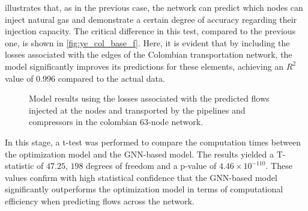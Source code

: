  illustrates that, as in the previous case, the network can predict which nodes can inject natural gas and demonstrate a certain degree of accuracy regarding their injection capacity. The critical difference in this test, compared to the previous one, is shown in \cref{fig:ye_col_base_f}. Here, it is evident that by including the losses associated with the edges of the Colombian transportation network, the model significantly improves its predictions for these elements, achieving an $R^2$ value of 0.996 compared to the actual data.


\begin{figure}
    \centering
        \setlength{}        
        \setlength{} 
        \caption{Model results using the losses associated with the predicted flows injected at the nodes and transported by the pipelines and compressors in the colombian 63-node network.}
        \label{fig:col_base_f_results}
\end{figure}


In this stage, a t-test was performed to compare the computation times between the optimization model and the GNN-based model. The results yielded a T-statistic of $47.25$, $198$ degrees of freedom and a p-value of $4.46 \times 10^{-110}$. These values confirm with high statistical confidence that the GNN-based model significantly outperforms the optimization model in terms of computational efficiency when predicting flows across the network.


